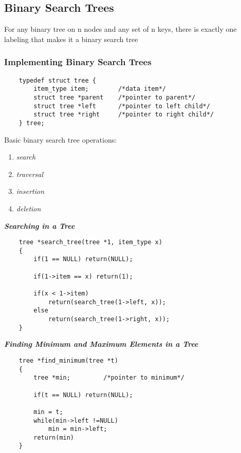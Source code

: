 \subsection{Binary Search Trees}

For any binary tree on n nodes and any set of n keys, there is exactly one labeling that makes it a binary search tree \\

\subsubsection{Implementing Binary Search Trees}

\begin{verbatim}
    typedef struct tree {
        item_type item;        /*data item*/
        struct tree *parent    /*pointer to parent*/
        struct tree *left      /*pointer to left child*/
        struct tree *right     /*pointer to right child*/
    } tree;
\end{verbatim}

Basic binary search tree operations:
\begin{enumerate}
	\item \emph{search}
	\item \emph{traversal}
	\item \emph{insertion}
	\item \emph{deletion}
\end{enumerate}

\textbf{ \emph{Searching in a Tree} }\\

\begin{verbatim}
    tree *search_tree(tree *1, item_type x)
    {
        if(1 == NULL) return(NULL);

        if(1->item == x) return(1);

        if(x < 1->item)
            return(search_tree(1->left, x));
        else
            return(search_tree(1->right, x));
    }
\end{verbatim}

\textbf{ \emph{Finding Minimum and Maximum Elements in a Tree} }\\

\begin{verbatim}
    tree *find_minimum(tree *t)
    {
        tree *min;         /*pointer to minimum*/

        if(t == NULL) return(NULL);

        min = t;
        while(min->left !=NULL)
            min = min->left;
        return(min)
    }
\end{verbatim}

